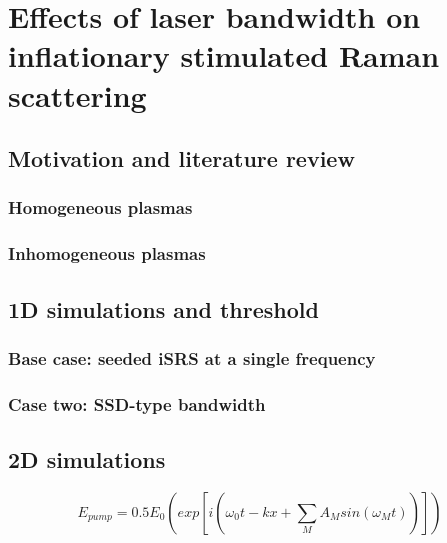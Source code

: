\chapter{Effects of laser bandwidth on inflationary stimulated Raman scattering}
\label{chp:broadbandSRS}

\section{Motivation and literature review}
\subsection{Homogeneous plasmas}
\subsection{Inhomogeneous plasmas}
\section{1D simulations and threshold}
\subsection{Base case: seeded iSRS at a single frequency}
\subsection{Case two: SSD-type bandwidth}
\section{2D simulations}
    $$E_{pump} = 0.5E_0\left(exp[i(\omega_0t-kx+\sum_MA_Msin(\omega_Mt))]\right)$$

